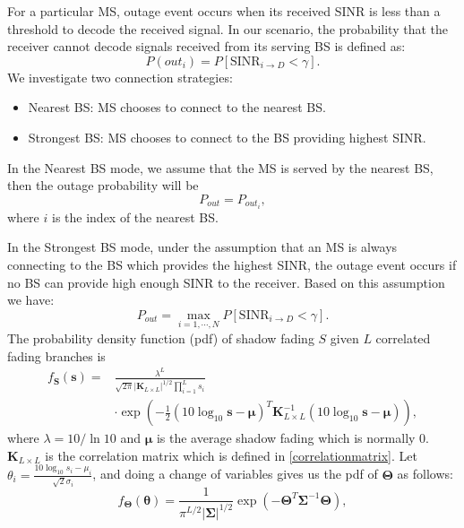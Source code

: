  \par For a particular MS, outage event occurs when its received SINR is less than a threshold to decode the received signal. In our scenario, the probability that the receiver cannot decode signals received from its serving BS is defined as:
 \begin{equation}
 P(out_{i}) = P[\text{SINR}_{i\to D} < \gamma].
 \end{equation}
 We investigate two connection strategies: 
 \begin{itemize}
 \item Nearest BS: MS chooses to connect to the nearest BS.
 \item Strongest BS: MS chooses to connect to the BS providing highest SINR.
 \end{itemize}
 \par In the Nearest BS mode, we assume that the MS is served by the nearest BS, then the outage probability will be 
 \begin{equation}
 P_{out} = P_{out_{i}},
 \end{equation} 
 where $i$ is the index of the nearest BS. 
 \par In the Strongest BS mode, under the assumption that an MS is always connecting to the BS which provides the highest SINR, the outage event occurs if no BS can provide high enough SINR to the receiver. Based on this assumption we have:
 \begin{equation}
 P_{out} = \max_{i = 1,\cdots,N} P[\text{SINR}_{i\to D}<\gamma].
 \end{equation}
 The probability density function (pdf) of shadow fading $S$ given $L$ correlated fading branches is
 \begin{equation}
 \begin{split}
 f_{\mathbf{S}}(\mathbf{s}) = &\frac{\lambda^{L}}{\sqrt{2\pi}|\mathbf{K}_{L\times L}|^{1/2}\prod_{i=1}^{L}s_{i}}\\
 &\cdot\exp(-\frac{1}{2}(10\log_{10}\mathbf{s}-\boldsymbol{\mu})^{T}\mathbf{K}_{L\times L}^{-1}(10\log_{10}\mathbf{s}-\boldsymbol{\mu})),
 \end{split}
 \end{equation}
 where $\lambda = 10/\ln10$ and $\boldsymbol{\mu}$ is the average shadow fading which is normally $0$. $\mathbf{K}_{L\times L}$ is the correlation matrix which is defined in \eqref{correlationmatrix}. Let $\theta_{i} = \frac{10\log_{10}s_{i}-\mu_{i}}{\sqrt{2}\sigma_{i}}$, and doing a change of variables gives us the pdf of $\mathbf{\Theta}$ as follows:
 \begin{equation}
 f_{\mathbf{\Theta}}(\boldsymbol{\theta}) = \frac{1}{\pi^{L/2}|\mathbf{\Sigma}|^{1/2}}\exp(-\mathbf{\Theta}^{T}\mathbf{\Sigma}^{-1}\mathbf{\Theta}),
 \end{equation}
